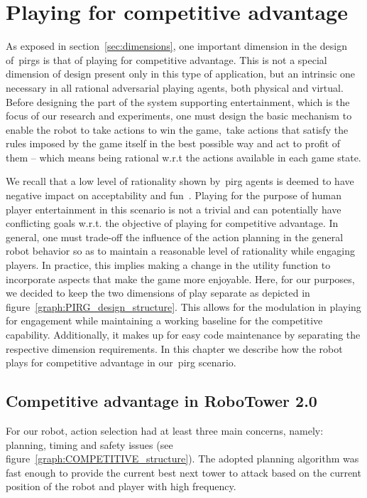 \chapter{Playing for competitive advantage}\label{ch:playing_for_advantage}

As exposed in section~\ref{sec:dimensions}, one important dimension in the design of~\glspl{pirg} is that of playing for competitive advantage. This is not a special dimension of design present only in this type of application, but an intrinsic one necessary in all rational adversarial playing agents, both physical and virtual. Before designing the part of the system supporting  entertainment, which is the focus of our research and experiments, one must design the basic mechanism to enable the robot to take actions to win the game,~\ie take actions that satisfy the rules imposed by the game itself in the best possible way and act to profit of them -- which means being rational w.r.t the actions available in each game state. 

We recall that a low level of rationality shown by~\gls{pirg} agents is deemed to have negative impact on acceptability and fun~\citep{martinoia_physically_2013}. Playing for the purpose of human player entertainment in this scenario is not a trivial and can potentially have conflicting goals w.r.t. the objective of playing for competitive advantage. In general, one must trade-off the influence of the action planning in the general robot behavior so as to maintain a reasonable level of rationality while engaging players. In practice, this implies making a change in the utility function to incorporate aspects that make the game more enjoyable. Here, for our purposes, we decided to keep the two dimensions of play separate as depicted in figure~\ref{graph:PIRG_design_structure}. This allows for the modulation in playing for engagement while maintaining a working baseline for the competitive capability. Additionally, it makes up for easy code maintenance by separating the respective dimension requirements. In this chapter we describe how the robot plays for competitive advantage in our~\gls{pirg} scenario.

\section{Competitive advantage in RoboTower 2.0}\label{sec:competitive_adv_robotower2}

For our robot, action selection had at least three main concerns, namely: planning, timing and safety issues (see figure~\ref{graph:COMPETITIVE_structure}). The adopted planning algorithm was fast enough to provide the current best next tower to attack based on the current position of the robot and player with high frequency.

